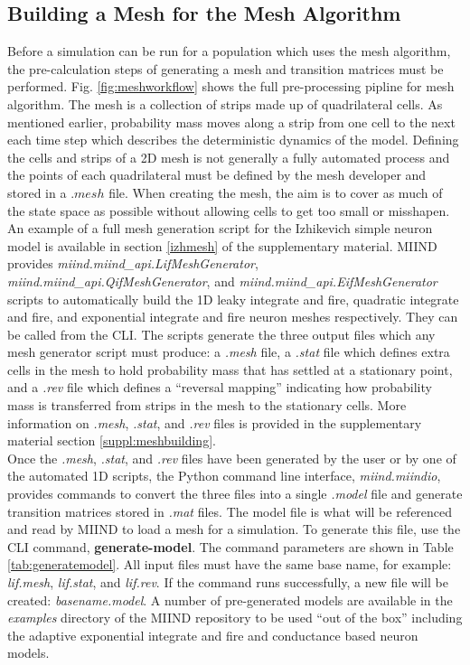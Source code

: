 \documentclass[utf8]{frontiersSCNS} %
\begin{document}
\subsection{Building a Mesh for the Mesh Algorithm}
\label{generatemodelmatfiles}
Before a simulation can be run for a population which uses the mesh algorithm, the pre-calculation steps of generating a mesh and transition matrices must be performed. Fig. \ref{fig:meshworkflow} shows the full pre-processing pipline for mesh algorithm. The mesh is a collection of strips made up of quadrilateral cells. As mentioned earlier, probability mass moves along a strip from one cell to the next each time step which describes the deterministic dynamics of the model. Defining the cells and strips of a 2D mesh is not generally a fully automated process and the points of each quadrilateral must be defined by the mesh developer and stored in a $.mesh$ file. When creating the mesh, the aim is to cover as much of the state space as possible without allowing cells to get too small or misshapen. An example of a full mesh generation script for the Izhikevich simple neuron model \citep{izhikevich2003simple} is available in section \ref{izhmesh} of the supplementary material. MIIND provides \textit{miind.miind\_api.LifMeshGenerator}, \textit{miind.miind\_api.QifMeshGenerator}, and \textit{miind.miind\_api.EifMeshGenerator} scripts to automatically build the 1D leaky integrate and fire, quadratic integrate and fire, and exponential integrate and fire neuron meshes respectively. They can be called from the CLI. The scripts generate the three output files which any mesh generator script must produce: a \textit{.mesh} file, a \textit{.stat} file which defines extra cells in the mesh to hold probability mass that has settled at a stationary point, and a \textit{.rev} file which defines a ``reversal mapping'' indicating how probability mass is transferred from strips in the mesh to the stationary cells. More information on \textit{.mesh}, \textit{.stat}, and \textit{.rev} files is provided in the supplementary material section \ref{suppl:meshbuilding}. \\ 

Once the \textit{.mesh}, \textit{.stat}, and \textit{.rev} files have been generated by the user or by one of the automated 1D scripts, the Python command line interface, \textit{miind.miindio}, provides commands to convert the three files into a single \textit{.model} file and generate transition matrices stored in \textit{.mat} files. The model file is what will be referenced and read by MIIND to load a mesh for a simulation. To generate this file, use the CLI command, \textbf{generate-model}. The command parameters are shown in Table \ref{tab:generatemodel}. All input files must have the same base name, for example: \textit{lif.mesh}, \textit{lif.stat}, and \textit{lif.rev}. If the command runs successfully, a new file will be created: \textit{basename.model}. A number of pre-generated models are available in the \textit{examples} directory of the MIIND repository to be used ``out of the box'' including the adaptive exponential integrate and fire and conductance based neuron models.
\end{document}
